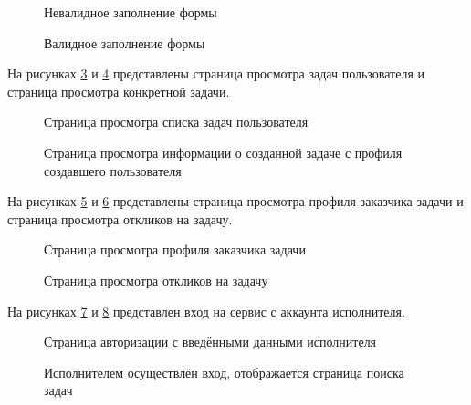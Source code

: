 \begin{figure}[ht]
	\caption{Невалидное заполнение формы}
	\label{t18:image}
\end{figure}
\clearpage

\begin{figure}[ht]
	\caption{Валидное заполнение формы}
	\label{t19:image}
\end{figure}


На рисунках \ref{t20:image} и \ref{t21:image} представлены страница просмотра задач пользователя и страница просмотра конкретной задачи.

\begin{figure}[ht]
	\caption{Страница просмотра списка задач пользователя}
	\label{t20:image}
\end{figure}
\clearpage

\begin{figure}[ht]
	\caption{Страница просмотра информации о созданной задаче с профиля создавшего пользователя}
	\label{t21:image}
\end{figure}

На рисунках \ref{t22:image} и \ref{t23:image} представлены страница просмотра профиля заказчика задачи и страница просмотра откликов на задачу.

\begin{figure}[ht]
	\caption{Страница просмотра профиля заказчика задачи}
	\label{t22:image}
\end{figure}

\begin{figure}[ht]
	\caption{Страница просмотра откликов на задачу}
	\label{t23:image}
\end{figure}
\clearpage

На рисунках \ref{t24:image} и \ref{t25:image} представлен вход на сервис с аккаунта исполнителя.

\begin{figure}[ht]
	\caption{Страница авторизации с введёнными данными исполнителя}
	\label{t24:image}
\end{figure}

\begin{figure}[ht]
	\caption{Исполнителем осуществлён вход, отображается страница поиска задач}
	\label{t25:image}
\end{figure}

